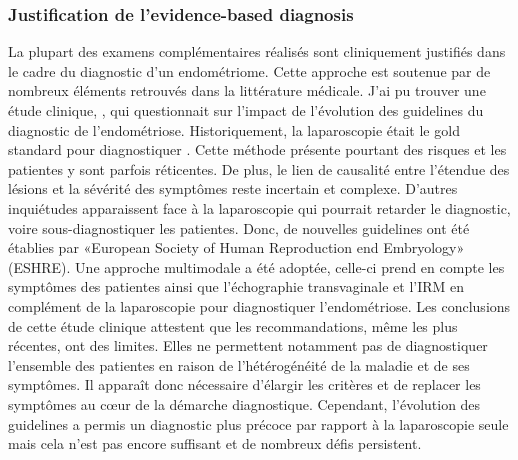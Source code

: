 \subsubsection*{Justification de l'evidence-based diagnosis}
La plupart des examens complémentaires réalisés sont cliniquement justifiés dans le cadre du diagnostic d’un endométriome. Cette approche est soutenue par de nombreux éléments retrouvés dans la littérature médicale. J’ai pu trouver une étude clinique, \textcite{nieva2024impact}, qui questionnait sur l’impact de l’évolution des guidelines du diagnostic de l’endométriose. Historiquement, la laparoscopie était le gold standard pour diagnostiquer . Cette méthode présente pourtant des risques et les patientes y sont parfois réticentes. De plus, le lien de causalité entre l’étendue des lésions et la sévérité des symptômes reste incertain et complexe. D’autres inquiétudes apparaissent face à la laparoscopie qui pourrait retarder le diagnostic, voire sous-diagnostiquer les patientes. Donc, de nouvelles guidelines ont été établies par «European Society of Human Reproduction end Embryology» (ESHRE). Une approche multimodale a été adoptée, celle-ci prend en compte les symptômes des patientes ainsi que l’échographie transvaginale et l’IRM en complément de la laparoscopie pour diagnostiquer l’endométriose.  Les conclusions de cette étude clinique attestent que les recommandations, même les plus récentes, ont des limites. Elles ne permettent notamment pas de diagnostiquer l'ensemble des patientes en raison de l'hétérogénéité de la maladie et de ses symptômes. Il apparaît donc nécessaire d'élargir les critères et de replacer les symptômes au cœur de la démarche diagnostique. Cependant, l’évolution des guidelines a permis un diagnostic plus précoce par rapport à la laparoscopie seule mais cela n’est pas encore suffisant et de nombreux défis persistent.

